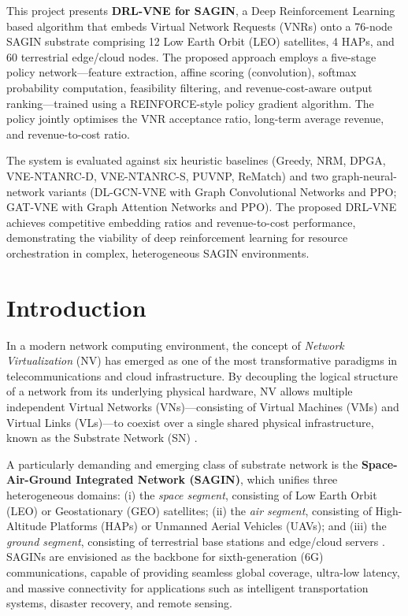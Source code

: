 \documentclass[12pt,a4paper]{report}
\begin{document}
This project presents \textbf{DRL-VNE for SAGIN}, a Deep Reinforcement Learning based
algorithm that embeds Virtual Network Requests (VNRs) onto a 76-node SAGIN substrate
comprising 12 Low Earth Orbit (LEO) satellites, 4 HAPs, and 60 terrestrial edge/cloud nodes.
The proposed approach employs a five-stage policy network---feature extraction, affine scoring
(convolution), softmax probability computation, feasibility filtering, and
revenue-cost-aware output ranking---trained using a REINFORCE-style policy gradient algorithm.
The policy jointly optimises the VNR acceptance ratio, long-term average revenue, and
revenue-to-cost ratio.

The system is evaluated against six heuristic baselines (Greedy, NRM, DPGA, VNE-NTANRC-D,
VNE-NTANRC-S, PUVNP, ReMatch) and two graph-neural-network variants (DL-GCN-VNE with Graph
Convolutional Networks and PPO; GAT-VNE with Graph Attention Networks and PPO). The proposed
DRL-VNE achieves competitive embedding ratios and revenue-to-cost performance, demonstrating
the viability of deep reinforcement learning for resource orchestration in complex,
heterogeneous SAGIN environments.

\tableofcontents
\listoffigures
\listoftables

\chapter{Introduction}

In a modern network computing environment, the concept of \textit{Network Virtualization}
(NV) has emerged as one of the most transformative paradigms in telecommunications and cloud
infrastructure. By decoupling the logical structure of a network from its underlying physical
hardware, NV allows multiple independent Virtual Networks (VNs)---consisting of Virtual
Machines (VMs) and Virtual Links (VLs)---to coexist over a single shared physical
infrastructure, known as the Substrate Network (SN) \cite{fischer2013virtual}.

A particularly demanding and emerging class of substrate network is the
\textbf{Space-Air-Ground Integrated Network (SAGIN)}, which unifies three heterogeneous
domains: (i) the \textit{space segment}, consisting of Low Earth Orbit (LEO) or Geostationary
(GEO) satellites; (ii) the \textit{air segment}, consisting of High-Altitude Platforms (HAPs)
or Unmanned Aerial Vehicles (UAVs); and (iii) the \textit{ground segment}, consisting of
terrestrial base stations and edge/cloud servers \cite{zhang2022drl}. SAGINs are envisioned
as the backbone for sixth-generation (6G) communications, capable of providing seamless global
coverage, ultra-low latency, and massive connectivity for applications such as intelligent
transportation systems, disaster recovery, and remote sensing.
\end{document}
